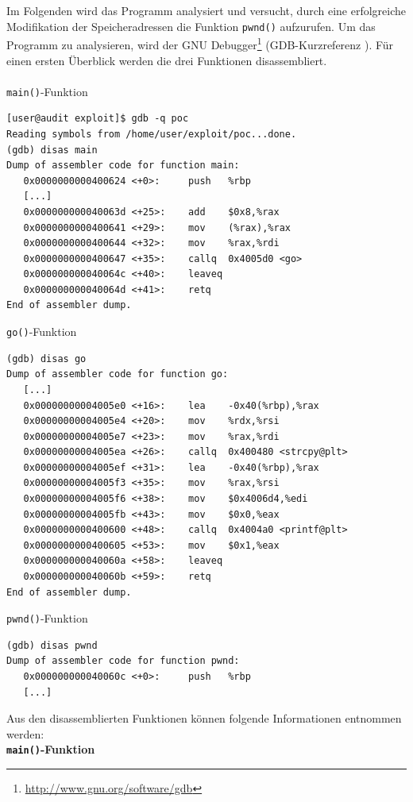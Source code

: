 \newpage
Im Folgenden wird das Programm analysiert und versucht, durch eine erfolgreiche Modifikation der Speicheradressen die Funktion \texttt{pwnd()} aufzurufen.
Um das Programm zu analysieren, wird der GNU Debugger\footnote{\url{http://www.gnu.org/software/gdb}} 
(GDB-Kurzreferenz \cite{hall_beejs}). %
Für einen ersten Überblick werden die drei Funktionen disassembliert.
\\
\\
\texttt{main()}-Funktion
\begin{lstlisting}[basicstyle=\ttfamily\footnotesize]
[user@audit exploit]$ gdb -q poc
Reading symbols from /home/user/exploit/poc...done.
(gdb) disas main
Dump of assembler code for function main:
   0x0000000000400624 <+0>:     push   %rbp
   [...]
   0x000000000040063d <+25>:    add    $0x8,%rax
   0x0000000000400641 <+29>:    mov    (%rax),%rax
   0x0000000000400644 <+32>:    mov    %rax,%rdi
   0x0000000000400647 <+35>:    callq  0x4005d0 <go>
   0x000000000040064c <+40>:    leaveq
   0x000000000040064d <+41>:    retq
End of assembler dump.
\end{lstlisting}


\texttt{go()}-Funktion
\begin{lstlisting}[basicstyle=\ttfamily\footnotesize]
(gdb) disas go
Dump of assembler code for function go:
   [...]
   0x00000000004005e0 <+16>:    lea    -0x40(%rbp),%rax
   0x00000000004005e4 <+20>:    mov    %rdx,%rsi
   0x00000000004005e7 <+23>:    mov    %rax,%rdi
   0x00000000004005ea <+26>:    callq  0x400480 <strcpy@plt>
   0x00000000004005ef <+31>:    lea    -0x40(%rbp),%rax
   0x00000000004005f3 <+35>:    mov    %rax,%rsi
   0x00000000004005f6 <+38>:    mov    $0x4006d4,%edi
   0x00000000004005fb <+43>:    mov    $0x0,%eax
   0x0000000000400600 <+48>:    callq  0x4004a0 <printf@plt>
   0x0000000000400605 <+53>:    mov    $0x1,%eax
   0x000000000040060a <+58>:    leaveq
   0x000000000040060b <+59>:    retq
End of assembler dump.
\end{lstlisting}

\newpage
\texttt{pwnd()}-Funktion
\begin{lstlisting}[basicstyle=\ttfamily\footnotesize]
(gdb) disas pwnd
Dump of assembler code for function pwnd:
   0x000000000040060c <+0>:     push   %rbp
   [...]
\end{lstlisting}
\par\medskip 
Aus den disassemblierten Funktionen können folgende Informationen entnommen werden:
\\
\textbf{\texttt{main()}-Funktion}

